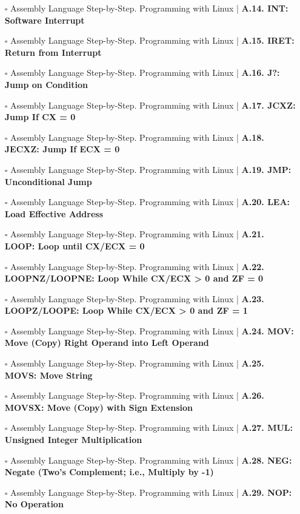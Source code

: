 \documentclass[a4, landscape, 12pt]{article}
\newcommand{\checkbox}{$\square$}%
\begin{document}
\begin{itemize}
{}
\item [\checkbox]  Assembly Language Step-by-Step. Programming with Linux | \textbf{ A.14. INT: Software Interrupt
}
\item [\checkbox]  Assembly Language Step-by-Step. Programming with Linux | \textbf{ A.15. IRET: Return from Interrupt
}
\item [\checkbox]  Assembly Language Step-by-Step. Programming with Linux | \textbf{ A.16. J?: Jump on Condition
}
\item [\checkbox]  Assembly Language Step-by-Step. Programming with Linux | \textbf{ A.17. JCXZ: Jump If CX = 0
}
\item [\checkbox]  Assembly Language Step-by-Step. Programming with Linux | \textbf{ A.18. JECXZ: Jump If ECX = 0
}
\item [\checkbox]  Assembly Language Step-by-Step. Programming with Linux | \textbf{ A.19. JMP: Unconditional Jump
}
\item [\checkbox]  Assembly Language Step-by-Step. Programming with Linux | \textbf{ A.20. LEA: Load Effective Address
}
\item [\checkbox]  Assembly Language Step-by-Step. Programming with Linux | \textbf{ A.21. LOOP: Loop until CX/ECX = 0
}
\item [\checkbox]  Assembly Language Step-by-Step. Programming with Linux | \textbf{ A.22. LOOPNZ/LOOPNE: Loop While CX/ECX > 0 and ZF = 0
}
\item [\checkbox]  Assembly Language Step-by-Step. Programming with Linux | \textbf{ A.23. LOOPZ/LOOPE: Loop While CX/ECX > 0 and ZF = 1
}
\item [\checkbox]  Assembly Language Step-by-Step. Programming with Linux | \textbf{ A.24. MOV: Move (Copy) Right Operand into Left Operand
}
\item [\checkbox]  Assembly Language Step-by-Step. Programming with Linux | \textbf{ A.25. MOVS: Move String
}
\item [\checkbox]  Assembly Language Step-by-Step. Programming with Linux | \textbf{ A.26. MOVSX: Move (Copy) with Sign Extension
}
\item [\checkbox]  Assembly Language Step-by-Step. Programming with Linux | \textbf{ A.27. MUL: Unsigned Integer Multiplication
}
\item [\checkbox]  Assembly Language Step-by-Step. Programming with Linux | \textbf{ A.28. NEG: Negate (Two's Complement; i.e., Multiply by -1)
}
\item [\checkbox] Assembly Language Step-by-Step. Programming with Linux | \textbf{ A.29. NOP: No Operation
}
\end{itemize}
\end{document}
